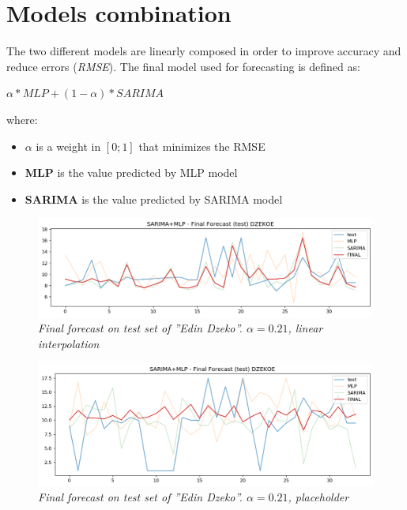 \section{Models combination}

The two different models are linearly composed in order to improve accuracy and reduce errors (\textit{RMSE}).
The final model used for forecasting is defined as:
\\
\begin{center}
  $\alpha * MLP + (1 - \alpha) * SARIMA$
\end{center}
where:
\begin{itemize}
    \item \textbf{$\alpha$} is a weight in $[0; 1]$ that minimizes the RMSE
    \item \textbf{MLP} is the value predicted by MLP model
    \item \textbf{SARIMA}  is the value predicted by SARIMA model 
\end{itemize}


\begin{figure}[H]
  \includegraphics[scale=0.5]{images/dzeko_final_forecast.png}
   \caption{\textit{Final forecast on test set of ''Edin Dzeko''. $\alpha  = 0.21$, \textit{linear interpolation}}}
  \label{fig:mlp}
\end{figure}

\begin{figure}[H]
  \includegraphics[scale=0.5]{images/dzeko_final_forecast_placeholder.png}
   \caption{\textit{Final forecast on test set of ''Edin Dzeko''. $\alpha  = 0.21$, \textit{placeholder}}}
  \label{fig:mlp}
\end{figure}



